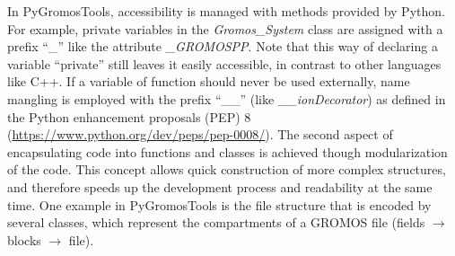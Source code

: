In PyGromosTools, accessibility is managed with methods provided by Python. For example, private variables in the \textit{Gromos\_System} class are assigned with a prefix ``\_'' like the attribute \textit{\_GROMOSPP}. Note that this way of declaring a variable ``private'' still leaves it easily accessible, in contrast to other languages like C++\cite{Stroustrup1995}. If a variable of function should never be used externally, name mangling is employed with the prefix ``\_\_'' (like \textit{\_\_ionDecorator}) as defined in the Python enhancement proposals (PEP) 8 (\url{https://www.python.org/dev/peps/pep-0008/}).
The second aspect of encapsulating code into functions and classes is achieved though modularization of the code. This concept allows quick construction of more complex structures, and therefore speeds up the development process and readability at the same time.\cite{Ganney2020}
One example in PyGromosTools is the file structure that is encoded by several classes, which represent the compartments of a GROMOS file (fields $\rightarrow$ blocks $\rightarrow$ file).
